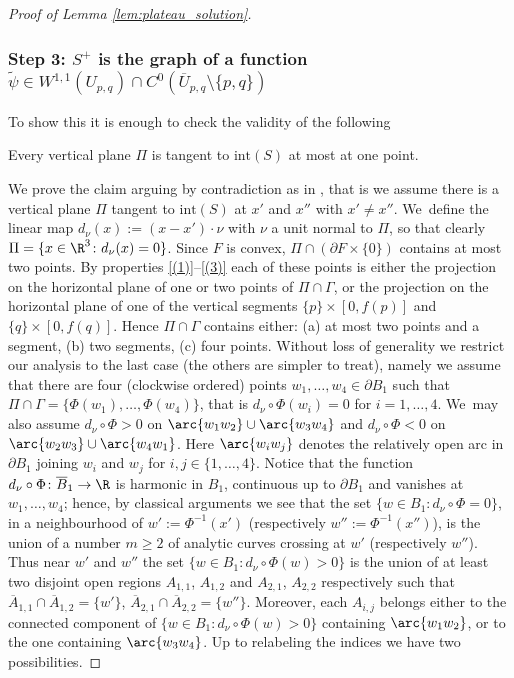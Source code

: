 \begin{proof}[Proof of Lemma \ref{lem:plateau_solution}]
\subsubsection*{Step 3: $S^+$
is the graph of a function $\widetilde \psi\in W^{1,1}(U_{p,q})\cap C^0(\overline U_{p,q}\setminus{\{p,q\}})$}
To show this it is enough to
check the validity of the following

\begin{claim*}
Every vertical plane $\Pi$ is tangent to $\mathrm{int}(S)$ at most at one point.
\end{claim*}

We prove the claim arguing by contradiction as in
\cite[p.\,97]{vortex}, that is we assume there is a vertical plane $\Pi$ tangent to $\mathrm{int}(S)$ at $x'$ and $x''$ with $x'\ne x''$. We~define the linear map $d_\nu(x):=(x-x')\cdot\nu $ with $\nu$ a unit normal to $\Pi$, so that clearly $\Pi=\{x\in\R^3\colon d_\nu(x)=0\}$.
Since $F$ is convex, $\Pi\cap (\partial F\times\{0\})$ contains at most two points. By properties \ref{(1)}--\ref{(3)} each of these points is either the projection on the horizontal plane of one or two points of $\Pi\cap\Gamma$, or the projection on the horizontal plane of one of the vertical segments $\{p\}\times[0,f(p)]$ and $\{q\}\times[0,f(q)]$. Hence $\Pi\cap \Gamma$ contains either: (a) at most two points and a segment, (b) two segments, (c) four points.
Without loss of generality we restrict our analysis to the last case (the others are simpler to treat), namely we assume that there are four (clockwise ordered) points $w_1,\dots,w_4\in\partial B_1$ such that
$\Pi\cap\Gamma=\{\Phi(w_1),\dots,\Phi(w_4)\}$, that is $d_\nu\circ\Phi(w_i)=0$ for $i=1,\dots,4$. We~may also assume
$d_\nu\circ\Phi>0$ on $\arc{w_1w_2}\cup\arc{w_3w_4}$ and
$d_\nu\circ\Phi<0$ on $\arc{w_2w_3}\cup\arc{w_4w_1}$. Here $\arc{w_iw_j}$ denotes the relatively open arc in $\partial B_1$ joining $w_i$ and $w_j$ for $i,j\in\{1,\dots,4\}$.
Notice that the function $d_\nu\circ\Phi\colon \overline B_1\to \R$ is harmonic in $B_1$, continuous up to $\partial B_1$ and vanishes at $w_1,\dots,w_4$; hence,
by classical arguments \cite[\S 437]{Nitsche:89} we see that the set $\{w\in B_1\colon d_\nu\circ\Phi=0\}$, in a neighbourhood of $w':=\Phi^{-1}(x')$ (respectively $w'':=\Phi^{-1}(x'')$), is the union of a number $m\geq 2$ of analytic curves crossing at $w'$ (respectively $w''$). Thus near $w'$ and $w''$ the set $\{w\in B_1\colon d_\nu\circ\Phi(w)>0\}$ is the union of at least two disjoint open regions $A_{1,1}$, $A_{1,2}$ and $A_{2,1}$, $A_{2,2}$ respectively such that $\overline A_{1,1}\cap\overline A_{1,2}=\{w'\}$, $\overline A_{2,1}\cap\overline A_{2,2}=\{w''\}$. Moreover, each $A_{i,j}$ belongs either to the connected component of $\{w\in B_1\colon d_\nu\circ\Phi(w)>0\}$ containing $\arc{w_1w_2}$,
or to the one containing $\arc{w_3w_4}$. Up to relabeling the indices we have two possibilities.


\end{proof}
